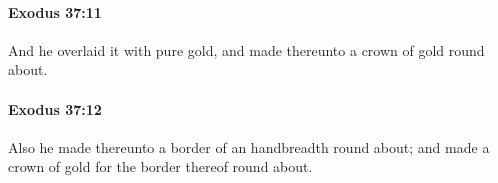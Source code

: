 		\paragraph{Exodus 37:11} %
			\label{EXODUS-37-11}

			And he overlaid it with pure gold, and made thereunto a crown of gold round about.


		\paragraph{Exodus 37:12} %
			\label{EXODUS-37-12}

			Also he made thereunto a border of an handbreadth round about; and made a crown of gold for the border thereof round about.


